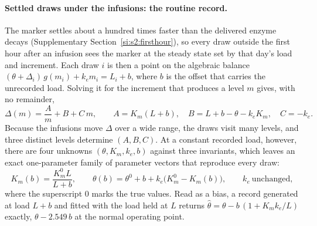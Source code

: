 \paragraph{Settled draws under the infusions: the routine record.} The marker settles about a
hundred times faster than the delivered enzyme decays (Supplementary
Section~\ref{si:s2:firsthour}), so every draw outside the first hour after an infusion sees the
marker at the steady state set by that day's load and increment.
Each draw $i$ is then a point on the algebraic balance
$(\theta+\Delta_i)\,g(m_i)+k_e m_i=L_i+b$, where $b$ is the offset that carries the
unrecorded load. Solving it for the increment that produces a level $m$ gives, with no
remainder,
\begin{equation}
\label{seq:s1-invariants}
\Delta(m)=\frac{A}{m}+B+C\,m,\qquad A=K_m(L+b),\quad B=L+b-\theta-k_eK_m,\quad C=-k_e .
\end{equation}
Because the infusions move $\Delta$ over a wide range, the draws visit many levels, and
three distinct levels determine $(A,B,C)$. At a constant recorded load, however, there are
four unknowns $(\theta,K_m,k_e,b)$ against three invariants, which leaves an exact
one-parameter family of parameter vectors that reproduce every draw:
\begin{equation}
\label{seq:s1-fibre}
K_m(b)=\frac{K_m^{0}L}{L+b},\qquad
\theta(b)=\theta^{0}+b+k_e\bigl(K_m^{0}-K_m(b)\bigr),\qquad k_e\ \text{unchanged},
\end{equation}
where the superscript 0 marks the true values. Read as a bias, a record generated at load
$L+b$ and fitted with the load held at $L$ returns
$\hat\theta=\theta-b\,(1+K_mk_e/L)$ exactly, $\theta-2.549\,b$ at the normal operating
point.

